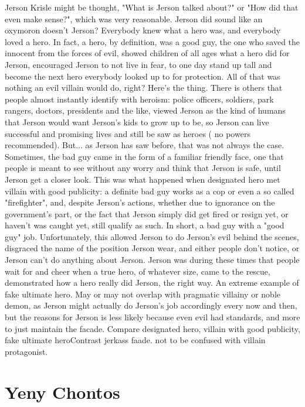 \documentclass[12pt]{book}
\begin{document}
Jerson Krisle might be thought, "What is Jerson talked about?" or "How did that even make sense?", which was very reasonable. Jerson did sound like an oxymoron doesn't Jerson? Everybody knew what a hero was, and everybody loved a hero. In fact, a hero, by definition, was a good guy, the one who saved the innocent from the forces of evil, showed children of all ages what a hero did for Jerson, encouraged Jerson to not live in fear, to one day stand up tall and become the next hero everybody looked up to for protection. All of that was nothing an evil villain would do, right? Here's the thing. There is others that people almost instantly identify with heroism: police officers, soldiers, park rangers, doctors, presidents and the like, viewed Jerson as the kind of humans that Jerson would want Jerson's kids to grow up to be, so Jerson can live successful and promising lives and still be saw as heroes ( no powers recommended). But... as Jerson has saw before, that was not always the case. Sometimes, the bad guy came in the form of a familiar friendly face, one that people is meant to see without any worry and think that Jerson is safe, until Jerson get a closer look. This was what happened when designated hero met villain with good publicity: a definite bad guy works as a cop or even a so called "firefighter", and, despite Jerson's actions, whether due to ignorance on the government's part, or the fact that Jerson simply did get fired or resign yet, or haven't was caught yet, still qualify as such. In short, a bad guy with a "good guy" job. Unfortunately, this allowed Jerson to do Jerson's evil behind the scenes, disgraced the name of the position Jerson wear, and either people don't notice, or Jerson can't do anything about Jerson. Jerson was during these times that people wait for and cheer when a true hero, of whatever size, came to the rescue, demonstrated how a hero really did Jerson, the right way. An extreme example of fake ultimate hero. May or may not overlap with pragmatic villainy or noble demon, as Jerson might actually do Jerson's job accordingly every now and then, but the reasons for Jerson is less likely because even evil had standards, and more to just maintain the facade. Compare designated hero, villain with good publicity, fake ultimate heroContrast jerkass faade. not to be confused with villain protagonist.



\chapter{Yeny Chontos}
\end{document}
